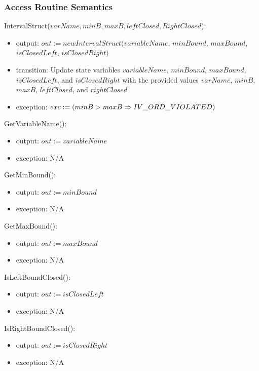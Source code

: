 \documentclass[12pt, titlepage]{article}
\begin{document}
\subsubsection{Access Routine Semantics}

\noindent IntervalStruct($varName, minB, maxB, leftClosed, RightClosed$):
\begin{itemize}
	\item output: $out := new IntervalStruct(variableName$, $minBound$, 
	$maxBound$, $isClosedLeft$, $isClosedRight)$
	\item transition: Update state variables $variableName$, $minBound$, 
	$maxBound$, $isClosedLeft$, and $isClosedRight$ with the provided values 
	$varName$, $minB$, $maxB$, $leftClosed$, and $rightClosed$
	\item exception: $exc := \\
	(minB > maxB \Rightarrow IV\_ORD\_VIOLATED)$
\end{itemize}

\noindent GetVariableName():
\begin{itemize}
	\item output: $out := variableName$
	\item exception: N/A
\end{itemize}

\noindent GetMinBound():
\begin{itemize}
	\item output: $out := minBound$
	\item exception: N/A
\end{itemize}

\noindent GetMaxBound():
\begin{itemize}
	\item output: $out := maxBound$
	\item exception: N/A
\end{itemize}

\noindent IsLeftBoundClosed():
\begin{itemize}
	\item output: $out := isClosedLeft$
	\item exception: N/A
\end{itemize}

\noindent IsRightBoundClosed():
\begin{itemize}
	\item output: $out := isClosedRight$
	\item exception: N/A
\end{itemize}
\end{document}
